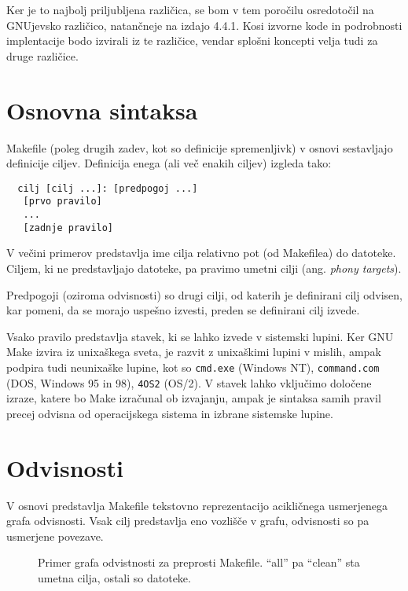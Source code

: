 \documentclass[notitlepage]{report}
\begin{document}
Ker je to najbolj priljubljena različica, se bom v tem poročilu
osredotočil na GNUjevsko različico, natančneje na izdajo 4.4.1. Kosi
izvorne kode in podrobnosti implentacije bodo izvirali iz te
različice, vendar splošni koncepti velja tudi za druge različice.

\section*{Osnovna sintaksa}

Makefile (poleg drugih zadev, kot so definicije spremenljivk) v osnovi
sestavljajo definicije ciljev. Definicija enega (ali več enakih
ciljev) izgleda tako:

\begin{verbatim}
  cilj [cilj ...]: [predpogoj ...]
   [prvo pravilo]
   ...
   [zadnje pravilo]
\end{verbatim}

V večini primerov predstavlja ime cilja relativno pot (od Makefilea)
do datoteke. Ciljem, ki ne predstavljajo datoteke, pa pravimo umetni
cilji (ang. \textit{phony targets}).

Predpogoji (oziroma odvisnosti) so drugi cilji, od katerih je
definirani cilj odvisen, kar pomeni, da se morajo uspešno izvesti,
preden se definirani cilj izvede.

Vsako pravilo predstavlja stavek, ki se lahko izvede v sistemski
lupini. Ker GNU Make izvira iz unixaškega sveta, je razvit z
unixaškimi lupini v mislih, ampak podpira tudi neunixaške lupine, kot
so \verb|cmd.exe| (Windows NT), \verb|command.com| (DOS, Windows 95 in
98), \verb|4OS2| (OS/2). V stavek lahko vključimo določene izraze,
katere bo Make izračunal ob izvajanju, ampak je sintaksa samih pravil
precej odvisna od operacijskega sistema in izbrane sistemske lupine.

\section*{Odvisnosti}

V osnovi predstavlja Makefile tekstovno reprezentacijo acikličnega
usmerjenega grafa odvisnosti. Vsak cilj predstavlja eno vozlišče v
grafu, odvisnosti so pa usmerjene povezave.

\begin{figure}[H]
  \caption{Primer grafa odvistnosti za preprosti Makefile. ``all'' pa
    ``clean'' sta umetna cilja, ostali so datoteke.}

\end{figure}
\end{document}
